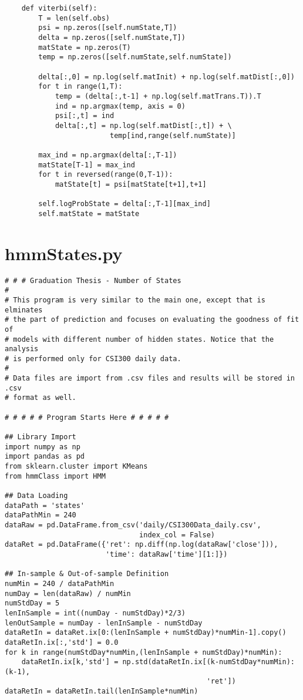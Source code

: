 \begin{spacing}{1.2}
\begin{lstlisting}
    def viterbi(self):
        T = len(self.obs)
        psi = np.zeros([self.numState,T])
        delta = np.zeros([self.numState,T])
        matState = np.zeros(T)
        temp = np.zeros([self.numState,self.numState])

        delta[:,0] = np.log(self.matInit) + np.log(self.matDist[:,0])
        for t in range(1,T):
            temp = (delta[:,t-1] + np.log(self.matTrans.T)).T
            ind = np.argmax(temp, axis = 0)
            psi[:,t] = ind
            delta[:,t] = np.log(self.matDist[:,t]) + \
                         temp[ind,range(self.numState)]
        
        max_ind = np.argmax(delta[:,T-1])
        matState[T-1] = max_ind
        for t in reversed(range(0,T-1)):
            matState[t] = psi[matState[t+1],t+1] 
        
        self.logProbState = delta[:,T-1][max_ind]
        self.matState = matState    
\end{lstlisting}
\newpage

\section{hmmStates.py}
\label{sec:code:states}
\begin{lstlisting}
# # # Graduation Thesis - Number of States 
#
# This program is very similar to the main one, except that is elminates 
# the part of prediction and focuses on evaluating the goodness of fit of 
# models with different number of hidden states. Notice that the analysis 
# is performed only for CSI300 daily data.
#
# Data files are import from .csv files and results will be stored in .csv
# format as well.
 
# # # # # Program Starts Here # # # # #

## Library Import
import numpy as np
import pandas as pd
from sklearn.cluster import KMeans
from hmmClass import HMM

## Data Loading
dataPath = 'states'
dataPathMin = 240
dataRaw = pd.DataFrame.from_csv('daily/CSI300Data_daily.csv',
                                index_col = False)
dataRet = pd.DataFrame({'ret': np.diff(np.log(dataRaw['close'])),
                        'time': dataRaw['time'][1:]})
                        
## In-sample & Out-of-sample Definition
numMin = 240 / dataPathMin
numDay = len(dataRaw) / numMin
numStdDay = 5
lenInSample = int((numDay - numStdDay)*2/3)
lenOutSample = numDay - lenInSample - numStdDay
dataRetIn = dataRet.ix[0:(lenInSample + numStdDay)*numMin-1].copy()
dataRetIn.ix[:,'std'] = 0.0
for k in range(numStdDay*numMin,(lenInSample + numStdDay)*numMin):
    dataRetIn.ix[k,'std'] = np.std(dataRetIn.ix[(k-numStdDay*numMin):(k-1),
                                                'ret'])
dataRetIn = dataRetIn.tail(lenInSample*numMin)


\end{lstlisting}
\end{spacing}
